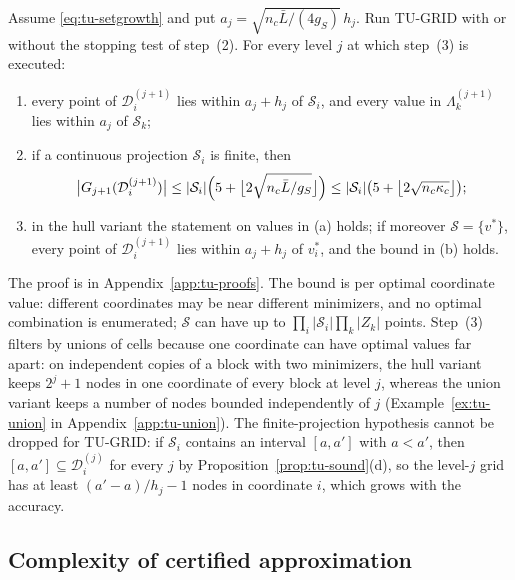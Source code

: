 \begin{theorem}\label{thm:tu-states}
Assume \eqref{eq:tu-setgrowth} and put $a_j=\sqrt{n_c\bar L/(4g_S)}\,h_j$.
Run TU-GRID with or without the stopping test of step~(2). For every level
$j$ at which step~(3) is executed:
\begin{enumerate}[label=(\alph*)]
\item every point of $\mathcal D^{(j+1)}_i$ lies within $a_j+h_j$ of
$\mathcal S_i$, and every value in $\Lambda^{(j+1)}_k$ lies within $a_j$ of
$\mathcal S_k$;
\item if a continuous projection $\mathcal S_i$ is finite, then
\[
\bigl\lvert G_{j+1}(\mathcal D^{(j+1)}_i)\bigr\rvert\le
\lvert\mathcal S_i\rvert\Bigl(5+\bigl\lfloor2\sqrt{n_c\bar L/g_S}\bigr\rfloor\Bigr)
\le\lvert\mathcal S_i\rvert\bigl(5+\bigl\lfloor2\sqrt{n_c\kappa_c}\bigr\rfloor\bigr);
\]
\item in the hull variant the statement on values in (a) holds; if moreover
$\mathcal S=\{v^*\}$, every point of $\mathcal D^{(j+1)}_i$ lies within
$a_j+h_j$ of $v^*_i$, and the bound in (b) holds.
\end{enumerate}
\end{theorem}

The proof is in Appendix~\ref{app:tu-proofs}. The bound is per optimal
coordinate value: different coordinates may be near different minimizers,
and no optimal combination is enumerated; $\mathcal S$ can have up to $\prod_i\lvert\mathcal S_i\rvert\prod_k\lvert Z_k\rvert$
points. Step~(3) filters by unions of cells because one coordinate can have
optimal values far apart: on independent copies of a block with two
minimizers, the hull variant keeps $2^j+1$ nodes in one coordinate of every
block at level $j$, whereas the union variant keeps a number of nodes
bounded independently of $j$ (Example~\ref{ex:tu-union} in
Appendix~\ref{app:tu-union}). The finite-projection hypothesis cannot be
dropped for TU-GRID: if $\mathcal S_i$ contains an interval $[a,a']$ with
$a<a'$, then $[a,a']\subseteq\mathcal D^{(j)}_i$ for every $j$ by
Proposition~\ref{prop:tu-sound}(d), so the level-$j$ grid has at least
$(a'-a)/h_j-1$ nodes in coordinate $i$, which grows with the accuracy.

\subsection{Complexity of certified approximation}\label{sec:tu-complexity}

